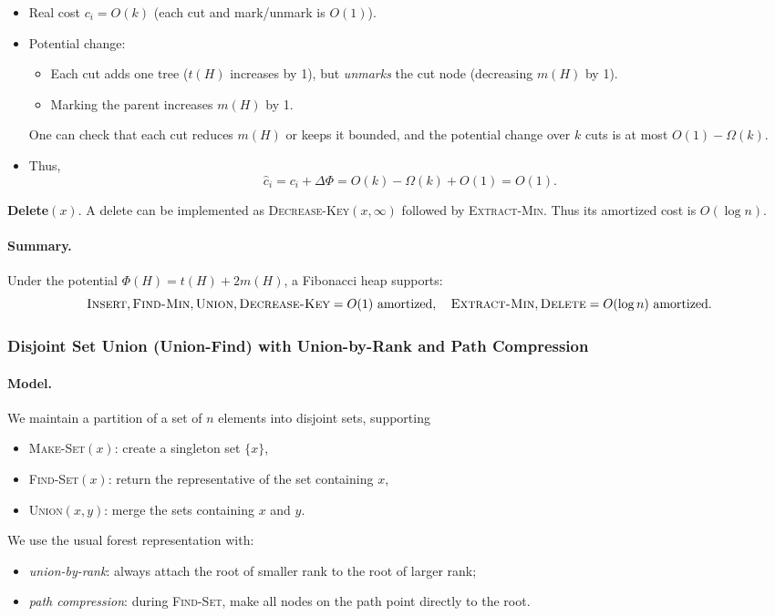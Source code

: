\documentclass[9pt]{extarticle}
\begin{document}
\begin{itemize}
  \item Real cost $c_i = O(k)$ (each cut and mark/unmark is $O(1)$).
  \item Potential change:
    \begin{itemize}
      \item Each cut adds one tree ($t(H)$ increases by 1),
            but \emph{unmarks} the cut node (decreasing $m(H)$ by 1).
      \item Marking the parent increases $m(H)$ by 1.
    \end{itemize}
    One can check that each cut reduces $m(H)$ or keeps it bounded,
    and the potential change over $k$ cuts is at most $O(1) - \Omega(k)$.
  \item Thus,
    \[
      \hat c_i = c_i + \Delta\Phi = O(k) - \Omega(k) + O(1) = O(1).
    \]
\end{itemize}

\textbf{Delete$(x)$}.  
A delete can be implemented as \textsc{Decrease-Key}$(x, \infty)$ followed by \textsc{Extract-Min}.  
Thus its amortized cost is $O(\log n)$.

\paragraph{Summary.}
Under the potential $\Phi(H) = t(H) + 2m(H)$, a Fibonacci heap supports:
\[
  \textsc{Insert}, \textsc{Find-Min}, \textsc{Union}, \textsc{Decrease-Key} = O(1) \text{ amortized},
\quad
  \textsc{Extract-Min}, \textsc{Delete} = O(\log n) \text{ amortized}.
\]

\subsubsection{Disjoint Set Union (Union-Find) with Union-by-Rank and Path Compression}

\paragraph{Model.}
We maintain a partition of a set of $n$ elements into disjoint sets, supporting
\begin{itemize}
  \item \textsc{Make-Set}$(x)$: create a singleton set $\{x\}$,
  \item \textsc{Find-Set}$(x)$: return the representative of the set containing $x$,
  \item \textsc{Union}$(x,y)$: merge the sets containing $x$ and $y$.
\end{itemize}
We use the usual forest representation with:
\begin{itemize}
  \item \emph{union-by-rank}: always attach the root of smaller rank to the root of larger rank;
  \item \emph{path compression}: during \textsc{Find-Set}, make all nodes on the path point directly to the root.
\end{itemize}
\end{document}
